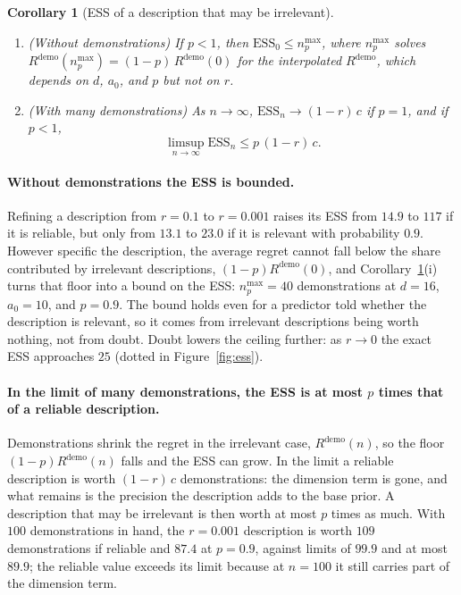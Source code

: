 \documentclass{article}
\newtheorem{corollary}[theorem]{Corollary}
\newcommand{\ess}{\mathrm{ESS}}
\begin{document}
\begin{corollary}[ESS of a description that may be irrelevant]\label{cor:ess}
\leavevmode
\begin{enumerate}[nosep]
    \item[(i)] (Without demonstrations) If $p < 1$, then $\ess_0 \le n^{\max}_p$, where $n^{\max}_p$ solves $R^{\mathrm{demo}}(n^{\max}_p) = (1-p)\,R^{\mathrm{demo}}(0)$ for the interpolated $R^{\mathrm{demo}}$, which depends on $d$, $a_0$, and $p$ but not on $r$.
    \item[(ii)] (With many demonstrations) As $n \to \infty$, $\ess_n \to (1-r)\,c$ if $p = 1$, and if $p < 1$,
    \[ \limsup_{n \to \infty} \ess_n \le p\,(1-r)\,c . \]
\end{enumerate}
\end{corollary}

\paragraph{Without demonstrations the ESS is bounded.} Refining a description from $r = 0.1$ to $r = 0.001$ raises its ESS from $14.9$ to $117$ if it is reliable, but only from $13.1$ to $23.0$ if it is relevant with probability $0.9$. However specific the description, the average regret cannot fall below the share contributed by irrelevant descriptions, $(1-p)R^{\mathrm{demo}}(0)$, and Corollary~\ref{cor:ess}(i) turns that floor into a bound on the ESS: $n^{\max}_p = 40$ demonstrations at $d = 16$, $a_0 = 10$, and $p = 0.9$. The bound holds even for a predictor told whether the description is relevant, so it comes from irrelevant descriptions being worth nothing, not from doubt. Doubt lowers the ceiling further: as $r \to 0$ the exact ESS approaches $25$ (dotted in Figure~\ref{fig:ess}).

\paragraph{In the limit of many demonstrations, the ESS is at most $p$ times that of a reliable description.} Demonstrations shrink the regret in the irrelevant case, $R^{\mathrm{demo}}(n)$, so the floor $(1-p)R^{\mathrm{demo}}(n)$ falls and the ESS can grow. In the limit a reliable description is worth $(1-r)\,c$ demonstrations: the dimension term is gone, and what remains is the precision the description adds to the base prior. A description that may be irrelevant is then worth at most $p$ times as much. With $100$ demonstrations in hand, the $r = 0.001$ description is worth $109$ demonstrations if reliable and $87.4$ at $p = 0.9$, against limits of $99.9$ and at most $89.9$; the reliable value exceeds its limit because at $n = 100$ it still carries part of the dimension term.
\end{document}
